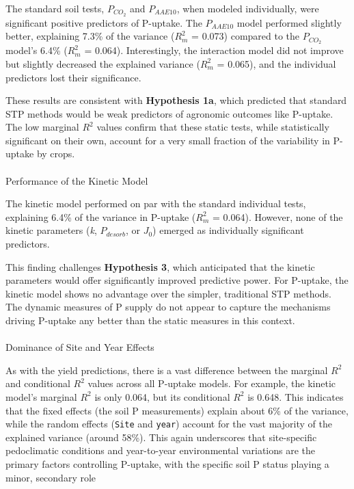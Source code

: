 \documentclass[
  a4paper,
]{article}
\makeatletter
\let\oldparagraph\paragraph
\renewcommand{\paragraph}{
    \@ifstar
      \xxxParagraphStar
      \xxxParagraphNoStar
  }
\newcommand{\xxxParagraphStar}[1]{\oldparagraph*{#1}\mbox{}}
\newcommand{\xxxParagraphNoStar}[1]{\oldparagraph{#1}\mbox{}}
\makeatother
\begin{document}
The standard soil tests, \(P_{CO_2}\) and \(P_{AAE10}\), when modeled
individually, were significant positive predictors of P-uptake. The
\(P_{AAE10}\) model performed slightly better, explaining 7.3\% of the
variance (\(R^2_m\) = 0.073) compared to the \(P_{CO_2}\) model's 6.4\%
(\(R^2_m\) = 0.064). Interestingly, the interaction model did not
improve but slightly decreased the explained variance (\(R^2_m\) =
0.065), and the individual predictors lost their significance.

These results are consistent with \textbf{Hypothesis 1a}, which
predicted that standard STP methods would be weak predictors of
agronomic outcomes like P-uptake. The low marginal \(R^2\) values
confirm that these static tests, while statistically significant on
their own, account for a very small fraction of the variability in
P-uptake by crops.

\paragraph{Performance of the Kinetic
Model}\label{performance-of-the-kinetic-model-1}

The kinetic model performed on par with the standard individual tests,
explaining 6.4\% of the variance in P-uptake (\(R^2_m\) = 0.064).
However, none of the kinetic parameters (\emph{k}, \(P_{desorb}\), or
\(J_0\)) emerged as individually significant predictors.

This finding challenges \textbf{Hypothesis 3}, which anticipated that
the kinetic parameters would offer significantly improved predictive
power. For P-uptake, the kinetic model shows no advantage over the
simpler, traditional STP methods. The dynamic measures of P supply do
not appear to capture the mechanisms driving P-uptake any better than
the static measures in this context.

\paragraph{Dominance of Site and Year
Effects}\label{dominance-of-site-and-year-effects}

As with the yield predictions, there is a vast difference between the
marginal \(R^2\) and conditional \(R^2\) values across all P-uptake
models. For example, the kinetic model's marginal \(R^2\) is only 0.064,
but its conditional \(R^2\) is 0.648. This indicates that the fixed
effects (the soil P measurements) explain about 6\% of the variance,
while the random effects (\texttt{Site} and \texttt{year}) account for
the vast majority of the explained variance (around 58\%). This again
underscores that site-specific pedoclimatic conditions and year-to-year
environmental variations are the primary factors controlling P-uptake,
with the specific soil P status playing a minor, secondary role
\end{document}
